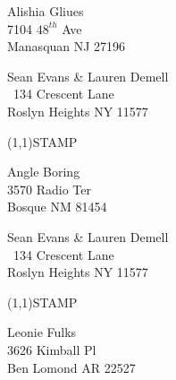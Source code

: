 \documentclass[12pt]{article}
\begin{document}
\begin{center} \begin{Huge} \vspace*{\fill}
Alishia Gliues\\
7104 $48^{th}$ Ave\\
Manasquan NJ 27196\\
\vspace{\fill} \end{Huge} \end{center}

\clearpage

\begin{minipage}{.5\linewidth} \noindent
Sean Evans \& Lauren Demell\\\ 
134 Crescent Lane\\ 
Roslyn Heights NY 11577
\end{minipage}
\begin{minipage}{.5\linewidth \hspace{-.2in} \vspace{-.3in}}
\begin{flushright}
\framebox(1,1){STAMP}
\end{flushright}
\end{minipage}

\begin{center} \begin{Huge} \vspace*{\fill}
Angle Boring\\
3570 Radio Ter\\
Bosque NM 81454\\
\vspace{\fill} \end{Huge} \end{center}

\clearpage

\begin{minipage}{.5\linewidth} \noindent
Sean Evans \& Lauren Demell\\\ 
134 Crescent Lane\\ 
Roslyn Heights NY 11577
\end{minipage}
\begin{minipage}{.5\linewidth \hspace{-.2in} \vspace{-.3in}}
\begin{flushright}
\framebox(1,1){STAMP}
\end{flushright}
\end{minipage}

\begin{center} \begin{Huge} \vspace*{\fill}
Leonie Fulks\\
3626 Kimball Pl\\
Ben Lomond AR 22527\\
\vspace{\fill} \end{Huge} \end{center}
\end{document}
